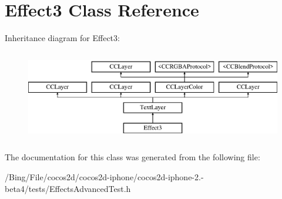 \hypertarget{interface_effect3}{\section{Effect3 Class Reference}
\label{interface_effect3}
}
Inheritance diagram for Effect3\-:\begin{figure}[H]
\begin{center}
\leavevmode
\includegraphics[height=4.000000cm]{interface_effect3}
\end{center}
\end{figure}


The documentation for this class was generated from the following file\-:\begin{DoxyCompactItemize}
\item 
/\-Bing/\-File/cocos2d/cocos2d-\/iphone/cocos2d-\/iphone-\/2.-\/beta4/tests/Effects\-Advanced\-Test.\-h\end{DoxyCompactItemize}
